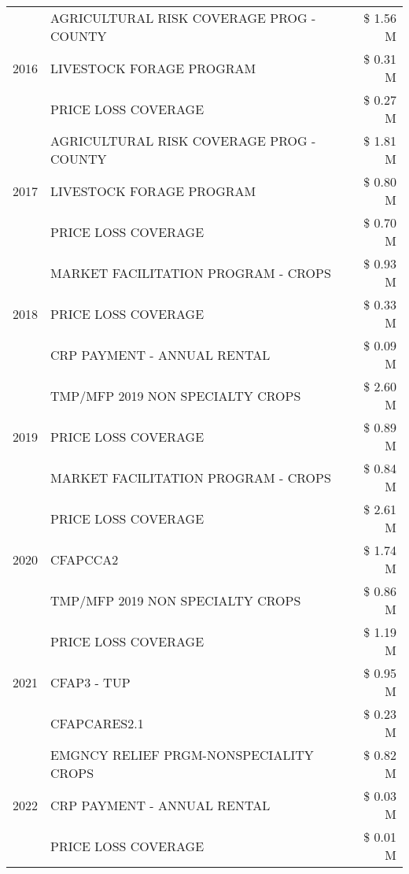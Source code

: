 \begin{tabular}{llr}
\cline{1-3}
\multirow[t]{3}{*}{2016} & AGRICULTURAL RISK COVERAGE PROG - COUNTY & \$ 1.56 M \\
 & LIVESTOCK FORAGE PROGRAM & \$ 0.31 M \\
 & PRICE LOSS COVERAGE & \$ 0.27 M \\
\cline{1-3}
\multirow[t]{3}{*}{2017} & AGRICULTURAL RISK COVERAGE PROG - COUNTY & \$ 1.81 M \\
 & LIVESTOCK FORAGE PROGRAM & \$ 0.80 M \\
 & PRICE LOSS COVERAGE & \$ 0.70 M \\
\cline{1-3}
\multirow[t]{3}{*}{2018} & MARKET FACILITATION PROGRAM - CROPS & \$ 0.93 M \\
 & PRICE LOSS COVERAGE & \$ 0.33 M \\
 & CRP PAYMENT - ANNUAL RENTAL & \$ 0.09 M \\
\cline{1-3}
\multirow[t]{3}{*}{2019} & TMP/MFP 2019 NON SPECIALTY CROPS & \$ 2.60 M \\
 & PRICE LOSS COVERAGE & \$ 0.89 M \\
 & MARKET FACILITATION PROGRAM - CROPS & \$ 0.84 M \\
\cline{1-3}
\multirow[t]{3}{*}{2020} & PRICE LOSS COVERAGE & \$ 2.61 M \\
 & CFAPCCA2 & \$ 1.74 M \\
 & TMP/MFP 2019 NON SPECIALTY CROPS & \$ 0.86 M \\
\cline{1-3}
\multirow[t]{3}{*}{2021} & PRICE LOSS COVERAGE & \$ 1.19 M \\
 & CFAP3 - TUP & \$ 0.95 M \\
 & CFAPCARES2.1 & \$ 0.23 M \\
\cline{1-3}
\multirow[t]{3}{*}{2022} & EMGNCY RELIEF PRGM-NONSPECIALITY CROPS & \$ 0.82 M \\
 & CRP PAYMENT - ANNUAL RENTAL & \$ 0.03 M \\
 & PRICE LOSS COVERAGE & \$ 0.01 M \\
\cline{1-3}
\bottomrule
\end{tabular}
